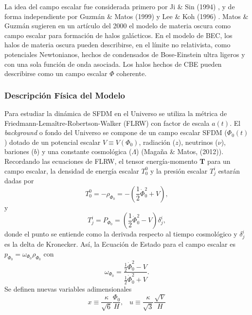 \documentclass[a4paper,openright,12pt]{book}
\begin{document}
La idea del campo escalar fue considerada primero por Ji \& Sin (1994) \cite{1.3.01}, y de forma independiente por Guzmán \& Matos (1999)\cite{Siddhartha Matos} y Lee \& Koh (1996) \cite{1.3.02}. Matos \& Guzmán sugieren en un artículo del 2000 \cite{1.3.03} el modelo de materia oscura como campo escalar para formación de halos galácticos. En el modelo de BEC, los halos de materia oscura pueden describirse, en el límite no relativista, como potenciales Newtonianos, hechos de condensados de Bose-Einstein ultra ligeros y con una sola función de onda asociada. Los halos hechos de CBE pueden describirse como un campo escalar $\Phi$ coherente.


\subsubsection{Descripción Física del Modelo}
Para estudiar la dinámica de SFDM en el Universo se utiliza la métrica de Friedmann-Lemaître-Robertson-Walker (FLRW) con factor de escala $a(t)$. El \textit{background} o fondo del Universo se compone de un campo escalar SFDM ($\Phi_{0}(t)$) dotado de un potencial escalar $V \equiv V(\Phi_{0})$, radiación ($z$), neutrinos ($\nu$), bariones ($b$) y una constante cosmológica ($\Lambda$) (Magaña \& Matos, (2012)). Recordando las ecuaciones de FLRW, el tensor energía-momento \textbf{T} para un campo escalar, la densidad de energía escalar $T_{0}^{0}$ y la presión escalar $T_{j}^{i}$ estarán dadas por
\begin{equation}
T_{0}^{0}=-\rho_{\Phi_{0}}=-\left(\frac{1}{2}\dot{\Phi}_{0}^{2} + V \right),\label{eqn 1.54}
\end{equation}
y
\begin{equation}
T_{j}^{i}=P_{\Phi_{0}}=\left(\frac{1}{2} \dot{\Phi}_{0}^{2}-V \right)\delta_{j}^{i},\label{eqn 1.55}
\end{equation}
donde el punto se entiende como la derivada respecto al tiempo cosmológico y $\delta_{j}^{i}$ es la delta de Kronecker. Así, la Ecuación de Estado para el campo escalar es $p_{\Phi_{0}}=\omega_{\Phi_{0}}\rho_{\Phi_{0}}$ con
\begin{equation}
\omega_{\Phi_{0}} = \frac{\frac{1}{2}\dot{\Phi}_{0}^{2}-V}{\frac{1}{2}\dot{\Phi}_{0}^{2}+V}.\label{eqn 1.56}
\end{equation}
Se definen nuevas variables adimensionales
\begin{equation}
x\equiv \frac{\kappa}{\sqrt{6}}\frac{\Phi_{0}}{H}, \;\;\; u\equiv\frac{\kappa}{\sqrt{3}}\frac{\sqrt{V}}{H}\label{eqn 1.57}
\end{equation}
\end{document}
